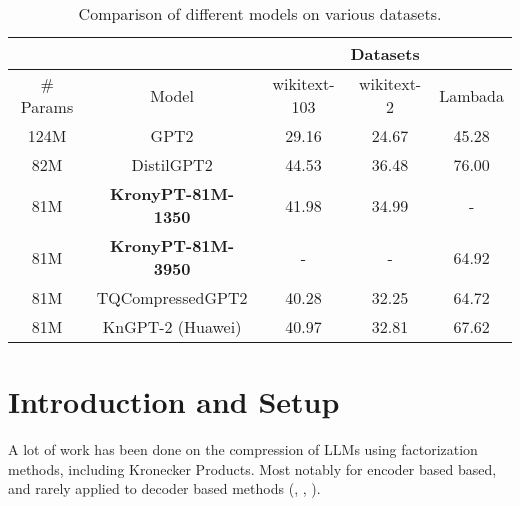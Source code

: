 \documentclass{article}
\begin{document}
\begin{table}[h]
\centering
\begin{tabular}{|c|c|c|c|c|}
\hline

 & & \multicolumn{3}{c|}{Datasets} \\ \hline
\# Params &  Model            & wikitext-103 & wikitext-2 & Lambada \\ \hline
124M      & GPT2              & 29.16        & 24.67      & 45.28      \\ \hline
82M       & DistilGPT2        & 44.53        & 36.48      & 76.00      \\ \hline
81M       & \textbf{KronyPT-81M-1350}  & 41.98        & 34.99      & -          \\ \hline
81M       & \textbf{KronyPT-81M-3950}  & -            & -          & 64.92      \\ \hline
81M       & TQCompressedGPT2  & 40.28        & 32.25      & 64.72      \\ \hline
81M       & KnGPT-2 (Huawei)  & 40.97        & 32.81      & 67.62      \\ \hline
\end{tabular}
\caption{Comparison of different models on various datasets.}
\end{table}



\section{Introduction and Setup}
\label{sec:Introduction and Setup}


A lot of work has been done on the compression of LLMs using factorization methods, including Kronecker Products. Most notably for encoder based based, and rarely applied to decoder based methods (\cite{tahaei2022kroneckerbert}, \cite{edalati2021kroneckr}, \cite{abronin2024tqcompressor}).
\end{document}
